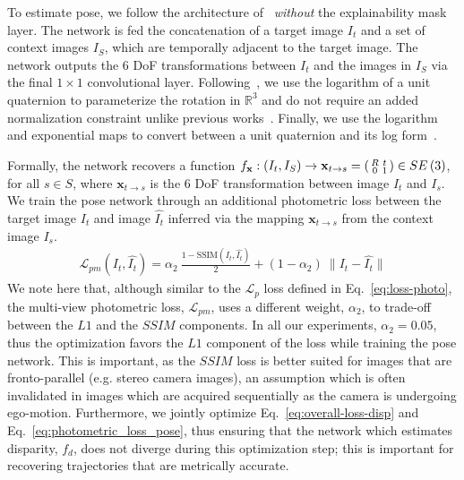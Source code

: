 \documentclass[letterpaper, 10 pt, conference]{ieeeconf}  \IEEEoverridecommandlockouts
\begin{document}
To estimate pose, we follow the architecture of~\cite{zhou2017unsupervised} \textit{without} the explainability mask layer. The network is fed the concatenation of a target image $I_{t}$ and a set of context images $I_{S}$, which are temporally adjacent to the target image. The network outputs the 6 DoF transformations between $I_t$ and the images in $I_{S}$ via the final $1\times 1$ convolutional layer. Following~\cite{brahmbhatt2018geometry,clark2017vinet,grassia1998practical}, we use the logarithm of a unit quaternion to parameterize the rotation in $\mathbb{R}^3$ and do not require an added normalization constraint unlike previous works~\cite{kendall2015posenet}. Finally, we use the logarithm and exponential maps to convert between a unit quaternion  and its log form~\cite{grassia1998practical}.

Formally, the network recovers a function $f_{\mathbf{x}}: (I_t,I_S) \to \mathbf{x}_{t \to s} = \begin{psmallmatrix}R & t\\ 0 & 1\end{psmallmatrix} \in SE\left(3\right)$, for all $s \in S$, where $\mathbf{x}_{t \to s}$  is the 6 DoF transformation between image $I_t$ and $I_s$. We train the pose network through an additional photometric loss between the target image $I_t$ and image $\hat{I_t}$ inferred via the mapping $\mathbf{x}_{t\to s}$ from the context image $I_s$. 
\begin{align}
\mathcal{L}_{pm}(I_t,\hat{I_t}) = \alpha_2~\frac{1 - \text{SSIM}(I_t,\hat{I_t})}{2} + (1-\alpha_2)~\| I_t - \hat{I_t} \|
    \label{eq:photometric_loss_pose}   
\end{align}
We note here that, although similar to the $\mathcal{L}_{p}$ loss defined in Eq.~\ref{eq:loss-photo}, the multi-view photometric loss, $\mathcal{L}_{pm}$,  uses a different weight, $\alpha_2$, to trade-off between the $L1$ and the $SSIM$ components. In all our experiments, $\alpha_2=0.05$, thus the optimization favors the $L1$ component of the loss while training the pose network. This is important, as the $SSIM$ loss is better suited for images that are fronto-parallel (e.g. stereo camera images), an assumption which is often invalidated in images which are acquired sequentially as the camera is undergoing ego-motion. Furthermore, we jointly optimize Eq.~\ref{eq:overall-loss-disp} and Eq.~\ref{eq:photometric_loss_pose}, thus ensuring that the network which estimates disparity, $f_d$, does not diverge during this optimization step; this is important for recovering trajectories that are metrically accurate.   
\end{document}
